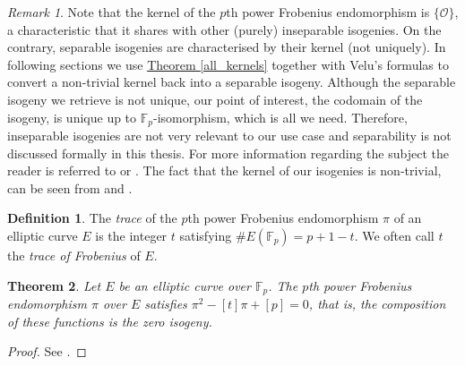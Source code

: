 \documentclass[openany, a4paper, 10pt]{book}
\theoremstyle{plain}
\newtheorem{theorem}{Theorem}[chapter]
\theoremstyle{plain}
\theoremstyle{plain}
\theoremstyle{definition}
\newtheorem{definition}[theorem]{Definition}
\theoremstyle{plain}
\theoremstyle{definition}
\theoremstyle{remark}
\newtheorem*{remark}{Remark}
\newcommand{\theoref}[1]{\hyperref[#1]{Theorem \ref{#1}}}
\begin{document}
\begin{remark}
    Note that the kernel of the $p$th power Frobenius endomorphism is $\{ \mathcal O \}$, a characteristic that it shares with other (purely) inseparable isogenies.
    On the contrary, separable isogenies are characterised by their kernel (not uniquely).
    In following sections we use \theoref{all_kernels} together with Velu's formulas \cite{velu} to convert a non-trivial kernel back into a separable isogeny.
    Although the separable isogeny we retrieve is not unique, our point of interest, the codomain of the isogeny, is unique up to $\mathbb F_p$-isomorphism, which is all we need.
    Therefore, inseparable isogenies are not very relevant to our use case and separability is not discussed formally in this thesis.
    For more information regarding the subject the reader is referred to \cite[Section~II.2]{arithmetic} or \cite[Sections~9.6,9.7]{galbraith_crypto}.
    The fact that the kernel of our isogenies is non-trivial, can be seen from \cite[Corollary~9.7.3]{galbraith_crypto} and \cite[Corollaries~III.5.3-III.5.5]{arithmetic}.
\end{remark}

\begin{definition}
    The \textit{trace} of the $p$th power Frobenius endomorphism $\pi$ of an elliptic curve $E$ is the integer $t$ satisfying $\#E(\mathbb F_p) = p + 1 - t$.
    We often call $t$ the \textit{trace of Frobenius} of $E$.
\end{definition}
\begin{theorem}\label{frobenius_satisfies}
    Let $E$ be an elliptic curve over $\mathbb F_p$.
    The $p$th power Frobenius endomorphism $\pi$ over $E$ satisfies
    $\pi^2 - [t]\pi + [p] = 0$, that is, the composition of these functions is the zero isogeny.
\end{theorem}
\begin{proof}
    See \cite[Theorem~V.2.3.1(b)]{arithmetic}.
\end{proof}
\end{document}
